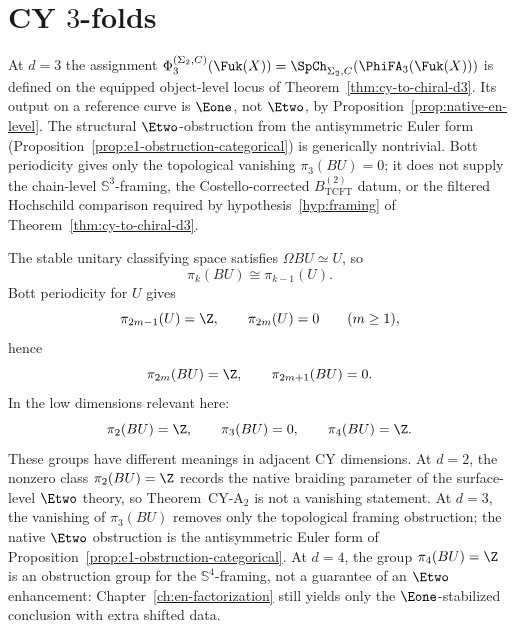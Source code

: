 \section{CY \texorpdfstring{$3$}{3}-folds}
\label{sec:fukaya-cy3}

At $d = 3$ the assignment
$\Phi_3^{(\Sigma_2,C)}(\Fuk(X))
 = \SpCh_{\Sigma_2, C}(\PhiFA_3(\Fuk(X)))$ is defined on the
equipped object-level locus of
Theorem~\ref{thm:cy-to-chiral-d3}. Its output on a reference curve is
$\Eone$, not $\Etwo$, by Proposition~\ref{prop:native-en-level}. The
structural $\Etwo$-obstruction from the antisymmetric Euler form
(Proposition~\ref{prop:e1-obstruction-categorical}) is generically
nontrivial. Bott periodicity gives only the topological vanishing
$\pi_3(BU) = 0$; it does not supply the chain-level
$\mathbb{S}^3$-framing, the Costello-corrected
$B^{(2)}_{\mathrm{TCFT}}$ datum, or the filtered Hochschild
comparison required by hypothesis~\ref{hyp:framing} of
Theorem~\ref{thm:cy-to-chiral-d3}.

\begin{remark}
\label{rem:fukaya-bott-verification}
The stable unitary classifying space satisfies $\Omega BU \simeq U$,
so
\[
 \pi_k(BU) \cong \pi_{k-1}(U).
\]
Bott periodicity for $U$ gives
\[
 \pi_{2m-1}(U) = \Z, \qquad \pi_{2m}(U) = 0 \qquad (m \geq 1),
\]
hence
\[
 \pi_{2m}(BU) = \Z, \qquad \pi_{2m+1}(BU) = 0.
\]
In the low dimensions relevant here:
\[
 \pi_2(BU) = \Z, \qquad \pi_3(BU) = 0, \qquad \pi_4(BU) = \Z.
\]
These groups have different meanings in adjacent CY dimensions. At
$d = 2$, the nonzero class $\pi_2(BU) = \Z$ records the native
braiding parameter of the surface-level $\Etwo$ theory, so
Theorem~CY-A$_2$ is not a vanishing statement. At $d = 3$, the
vanishing of $\pi_3(BU)$ removes only the topological framing
obstruction; the native $\Etwo$ obstruction is the antisymmetric
Euler form of Proposition~\ref{prop:e1-obstruction-categorical}. At
$d = 4$, the group $\pi_4(BU) = \Z$ is an obstruction group for the
$\mathbb{S}^4$-framing, not a guarantee of an $\Etwo$ enhancement:
Chapter~\ref{ch:en-factorization} still yields only the
$\Eone$-stabilized conclusion with extra shifted data.
\end{remark}

